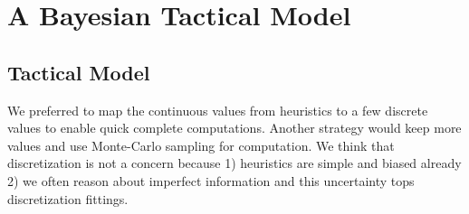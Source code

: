 \section{A Bayesian Tactical Model}
\label{sec:tacticalmodel}

\subsection{Tactical Model}

We preferred to map the continuous values from heuristics to a few discrete values to enable quick complete computations. Another strategy would keep more values and use Monte-Carlo sampling for computation. We think that discretization is not a concern because 1) heuristics are simple and biased already 2) we often reason about imperfect information and this uncertainty tops discretization fittings.

